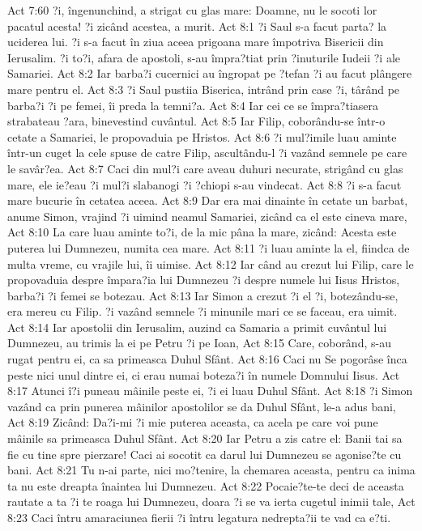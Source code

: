 Act 7:60  ?i, îngenunchind, a strigat cu glas mare: Doamne, nu le socoti lor pacatul acesta! ?i zicând acestea, a murit.
Act 8:1  ?i Saul s-a facut parta? la uciderea lui. ?i s-a facut în ziua aceea prigoana mare împotriva Bisericii din Ierusalim. ?i to?i, afara de apostoli, s-au împra?tiat prin ?inuturile Iudeii ?i ale Samariei.
Act 8:2  Iar barba?i cucernici au îngropat pe ?tefan ?i au facut plângere mare pentru el.
Act 8:3  ?i Saul pustiia Biserica, intrând prin case ?i, târând pe barba?i ?i pe femei, îi preda la temni?a.
Act 8:4  Iar cei ce se împra?tiasera strabateau ?ara, binevestind cuvântul.
Act 8:5  Iar Filip, coborându-se într-o cetate a Samariei, le propovaduia pe Hristos.
Act 8:6  ?i mul?imile luau aminte într-un cuget la cele spuse de catre Filip, ascultându-l ?i vazând semnele pe care le savâr?ea.
Act 8:7  Caci din mul?i care aveau duhuri necurate, strigând cu glas mare, ele ie?eau ?i mul?i slabanogi ?i ?chiopi s-au vindecat.
Act 8:8  ?i s-a facut mare bucurie în cetatea aceea.
Act 8:9  Dar era mai dinainte în cetate un barbat, anume Simon, vrajind ?i uimind neamul Samariei, zicând ca el este cineva mare,
Act 8:10  La care luau aminte to?i, de la mic pâna la mare, zicând: Acesta este puterea lui Dumnezeu, numita cea mare.
Act 8:11  ?i luau aminte la el, fiindca de multa vreme, cu vrajile lui, îi uimise.
Act 8:12  Iar când au crezut lui Filip, care le propovaduia despre împara?ia lui Dumnezeu ?i despre numele lui Iisus Hristos, barba?i ?i femei se botezau.
Act 8:13  Iar Simon a crezut ?i el ?i, botezându-se, era mereu cu Filip. ?i vazând semnele ?i minunile mari ce se faceau, era uimit.
Act 8:14  Iar apostolii din Ierusalim, auzind ca Samaria a primit cuvântul lui Dumnezeu, au trimis la ei pe Petru ?i pe Ioan,
Act 8:15  Care, coborând, s-au rugat pentru ei, ca sa primeasca Duhul Sfânt.
Act 8:16  Caci nu Se pogorâse înca peste nici unul dintre ei, ci erau numai boteza?i în numele Domnului Iisus.
Act 8:17  Atunci î?i puneau mâinile peste ei, ?i ei luau Duhul Sfânt.
Act 8:18  ?i Simon vazând ca prin punerea mâinilor apostolilor se da Duhul Sfânt, le-a adus bani,
Act 8:19  Zicând: Da?i-mi ?i mie puterea aceasta, ca acela pe care voi pune mâinile sa primeasca Duhul Sfânt.
Act 8:20  Iar Petru a zis catre el: Banii tai sa fie cu tine spre pierzare! Caci ai socotit ca darul lui Dumnezeu se agonise?te cu bani.
Act 8:21  Tu n-ai parte, nici mo?tenire, la chemarea aceasta, pentru ca inima ta nu este dreapta înaintea lui Dumnezeu.
Act 8:22  Pocaie?te-te deci de aceasta rautate a ta ?i te roaga lui Dumnezeu, doara ?i se va ierta cugetul inimii tale,
Act 8:23  Caci întru amaraciunea fierii ?i întru legatura nedrepta?ii te vad ca e?ti.
